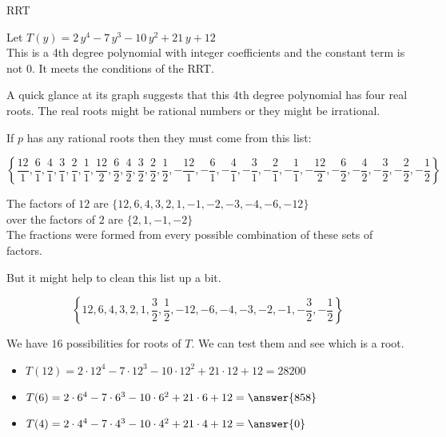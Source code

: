 \documentclass{ximera}
\begin{document}
\begin{example} RRT


Let $T(y) = 2\, y^4 - 7 \, y^3 - 10 \, y^2 + 21 \, y + 12$ \\


This is a 4th degree polynomial with integer coefficients and the constant term is not $0$. It meets the conditions of the RRT.


A quick glance at its graph suggests that this 4th degree polynomial has four real roots. The real roots might be rational numbers or they might be irrational.

If $p$ has any rational roots then they must come from this list:




\[
\left\{  \frac{12}{1},  \frac{6}{1}, \frac{4}{1}, \frac{3}{1}, \frac{2}{1}, \frac{1}{1}, \frac{12}{2},  \frac{6}{2}, \frac{4}{2}, \frac{3}{2}, \frac{2}{2}, \frac{1}{2},  -\frac{12}{1},  -\frac{6}{1}, -\frac{4}{1}, -\frac{3}{1}, -\frac{2}{1}, -\frac{1}{1}, -\frac{12}{2},  -\frac{6}{2}, -\frac{4}{2}, -\frac{3}{2}, -\frac{2}{2}, -\frac{1}{2}                 \right\}
\]


The factors of $12$ are $\{ 12, 6, 4, 3, 2, 1, -1, -2, -3, -4, -6, -12 \}$ \\

over the factors of $2$ are $\{ 2, 1, -1, -2 \}$ \\


The fractions were formed from every possible combination of these sets of factors.

But it might help to clean this list up a bit.

\[
\left\{  12,  6, 4, 3, 2, 1,  \frac{3}{2},  \frac{1}{2},  -12,  -6, -4, -3, -2, -1,  -\frac{3}{2},  -\frac{1}{2}                 \right\}
\]





We have $16$ possibilities for roots of $T$.  We can test them and see which is a root.










\begin{itemize}
\item $T(12) =  2 \cdot 12^4 - 7 \cdot 12^3 - 10 \cdot 12^2 + 21 \cdot 12 + 12 = 28200$ \\
\item $T(6) =  2 \cdot 6^4 - 7 \cdot 6^3 - 10 \cdot 6^2 + 21 \cdot 6 + 12 = \answer{858}$  \\
\item $T(4) =  2 \cdot 4^4 - 7 \cdot 4^3 - 10 \cdot 4^2 + 21 \cdot 4 + 12 = \answer{0}$  \\
\end{itemize}



\end{example}
\end{document}
